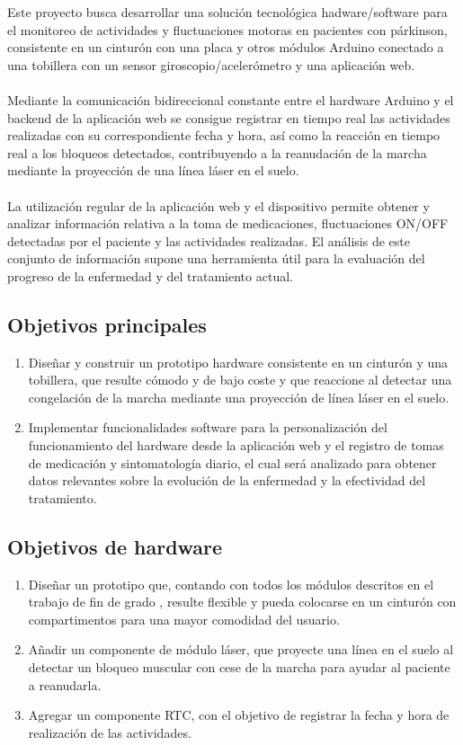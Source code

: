 Este proyecto busca desarrollar una solución tecnológica hadware/software para el monitoreo de actividades y fluctuaciones motoras en pacientes con párkinson, consistente en un cinturón con una placa y otros módulos Arduino conectado a una tobillera con un sensor giroscopio/acelerómetro y una aplicación web. \\ \\
Mediante la comunicación bidireccional constante entre el hardware Arduino y el backend de la aplicación web se consigue registrar en tiempo real las actividades realizadas con su correspondiente fecha y hora, así como la reacción en tiempo real a los bloqueos detectados, contribuyendo a la reanudación de la marcha mediante la proyección de una línea láser en el suelo.\\ \\
La utilización regular de la aplicación web y el dispositivo permite obtener y analizar información relativa a la toma de medicaciones, fluctuaciones ON/OFF detectadas por el paciente y las actividades realizadas. El análisis de este conjunto de información supone una herramienta útil para la evaluación del progreso de la enfermedad y del tratamiento actual.
\subsection{Objetivos principales}
\begin{enumerate}
    \item Diseñar y construir un prototipo hardware consistente en un cinturón y una tobillera, que resulte cómodo y de bajo coste y que reaccione al detectar una congelación de la marcha mediante una proyección de línea láser en el suelo.
    \item Implementar funcionalidades software para la personalización del funcionamiento del hardware desde la aplicación web y el registro de tomas de medicación y sintomatología diario, el cual será analizado para obtener datos relevantes sobre la evolución de la enfermedad y la efectividad del tratamiento.
\end{enumerate}

\subsection{Objetivos de hardware}
\begin{enumerate}
    \item Diseñar un prototipo que, contando con todos los módulos descritos en el trabajo de fin de grado \cite{Martos2024}, resulte flexible y pueda colocarse en un cinturón con compartimentos para una mayor comodidad del usuario. 
    \item Añadir un componente de módulo láser, que proyecte una línea en el suelo al detectar un bloqueo muscular con cese de la marcha para ayudar al paciente a reanudarla.
    \item Agregar un componente RTC, con el objetivo de registrar la fecha y hora de realización de las actividades.
\end{enumerate}

